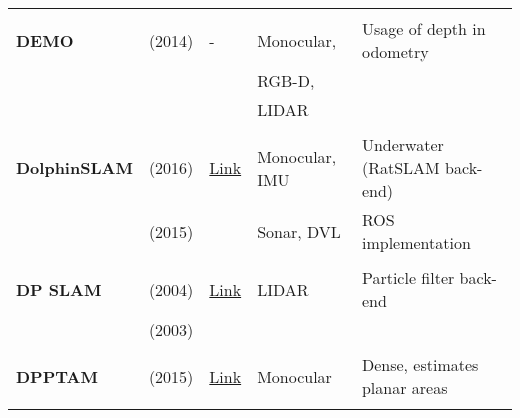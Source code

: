 \documentclass[a4paper,12pt]{scrartcl}
\begin{document}
{\begin{longtable}{l|l|l|l|l}
                           &                                   &                                                                    &                       &\\
    \textbf{DEMO}          & \cite{Zhang2014} (2014)           & -                                                                  & Monocular,            & Usage of depth in odometry\\
                           &                                   &                                                                    & RGB-D,                &\\
                           &                                   &                                                                    & LIDAR                 &\\
                           &                                   &                                                                    &                       &\\
    \textbf{DolphinSLAM}   & \cite{Zaffari2016} (2016)         & {\href{https://github.com/dolphin-slam}{Link}}                     & Monocular, IMU        & Underwater (RatSLAM back-end)\\
                           & \cite{Silveira2015} (2015)        &                                                                    & Sonar, DVL            & ROS implementation\\
                           &                                   &                                                                    &                       &\\
    \textbf{DP SLAM}       & \cite{Eliazar2004} (2004)         & {\href{https://users.cs.duke.edu/~parr/dpslam}{Link}}              & LIDAR                 & Particle filter back-end\\
                           & \cite{Eliazar2003} (2003)         &                                                                    &                       &\\
                           &                                   &                                                                    &                       &\\
    \textbf{DPPTAM}        & \cite{Concha2015b} (2015)         & {\href{https://github.com/alejocb/dpptam}{Link}}                   & Monocular             & Dense, estimates planar areas\\
                           &                                   &                                                                    &                       &\\

\end{longtable}}
\end{document}

